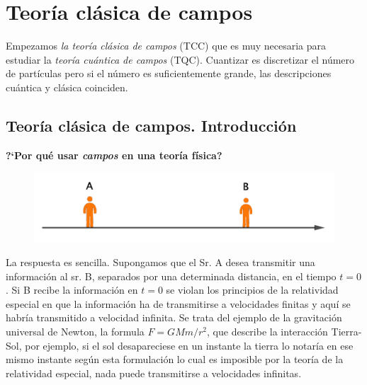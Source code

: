 \chapter{Teoría clásica de campos}


\vspace{10mm}
\begin{adjustwidth}{50pt}{50pt}
\begin{ejemplo}

Empezamos \emph{la teoría clásica de campos} (TCC) que es muy necesaria para estudiar la \emph{teoría cuántica de campos} (TQC). Cuantizar es discretizar el número de partículas pero si el número es suficientemente grande, las descripciones cuántica y clásica coinciden.

\end{ejemplo}
\end{adjustwidth}
\vspace{5mm}

\section{Teoría clásica de campos. Introducción}

\textbf{?`Por qué usar \emph{campos} en una teoría física?}

\begin{figure}[H]
	\centering
	\includegraphics[width=.75\textwidth]{imagenes/img28-01.png}
\end{figure}

La respuesta es sencilla. Supongamos que el Sr. A desea transmitir una información al sr. B, separados por una determinada distancia,  en el tiempo $t=0$. Si B recibe la información en $t=0$ se violan los principios de la relatividad especial en que la información ha de transmitirse a velocidades finitas y aquí se habría transmitido a velocidad infinita. Se trata del ejemplo de la gravitación universal de Newton, la formula $F=GMm/r^2$, que describe la interacción Tierra-Sol, por ejemplo, si el sol desapareciese en un instante la tierra lo notaría en ese mismo instante según esta formulación lo cual es imposible por la teoría de la relatividad especial, nada puede transmitirse a velocidades infinitas.

